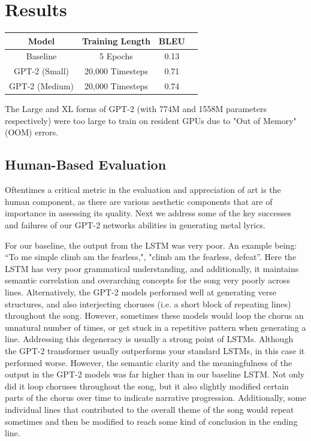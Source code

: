 \documentclass[11pt]{article}
\begin{document}
\section{Results}

\begin{center}
\begin{tabular}{ |c|c|c|c| } 
\hline
Model & Training Length & BLEU \\
\hline
Baseline & 5 Epochs & 0.13 \\ 
GPT-2 (Small) & 20,000 Timesteps & 0.71 \\ 
GPT-2 (Medium) & 20,000 Timesteps & 0.74 \\ 
\hline
\end{tabular}
\end{center}

The Large and XL forms of GPT-2 (with 774M and 1558M parameters respectively) were too large to train on resident GPUs due to "Out of Memory" (OOM) errors.

\subsection{Human-Based Evaluation}
Oftentimes a critical metric in the evaluation and appreciation of art is the human component, as there are various aesthetic components that are of importance in assessing its quality. Next we address some of the key successes and failures of our GPT-2 networks abilities in generating metal lyrics.

For our baseline, the output from the LSTM was very poor. An example being: “To me simple climb am the fearless,", "climb am the fearless, defeat”. Here the LSTM has very poor grammatical understanding, and additionally, it maintains semantic correlation and overarching concepts for the song very poorly across lines. Alternatively, the GPT-2 models performed well at generating verse structures, and also interjecting choruses (i.e. a short block of repeating lines) throughout the song. However, sometimes these models would loop the chorus an unnatural number of times, or get stuck in a repetitive pattern when generating a line. Addressing this degeneracy is usually a strong point of LSTMs. Although the GPT-2 transformer usually outperforms your standard LSTMs, in this case it performed worse. However, the semantic clarity and the meaningfulness of the output in the GPT-2 models was far higher than in our baseline LSTM. Not only did it loop choruses throughout the song, but it also slightly modified certain parts of the chorus over time to indicate narrative progression. Additionally, some individual lines that contributed to the overall theme of the song would repeat sometimes and then be modified to reach some kind of conclusion in the ending line.
\end{document}
